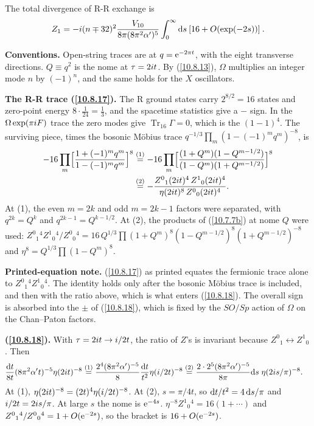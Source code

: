 	The total divergence of R-R exchange is
	\begin{equation}
		Z_{1} = -i(n\mp 32)^{2} \frac{V_{10}}{8\pi (8\pi^{2}\alpha^{\prime})^{5}}
		\int^{\infty}_{0}\mathrm{d} s \:[16+O(\exp(-2s))] \:. \label{10.8.19}
	\end{equation}
	\begin{tcolorbox}[breakable]
		\begin{remark}
			\textbf{Conventions.} Open-string traces are at $q=\mathrm{e}^{-2\pi t}$, with the eight transverse directions. $Q\equiv q^{2}$ is the nome at $\tau=2i t$. By (\ref{10.8.13}), $\Omega$ multiplies an integer mode $n$ by $(-1)^n$, and the same holds for the $X$ oscillators.

			\textbf{The R-R trace (\ref{10.8.17}).} The R ground states carry $2^{8/2}=16$ states and zero-point energy $8\cdot\tfrac1{24}=\tfrac13$, and the spacetime statistics give a $-$ sign. In the $\Omega\exp(\pi i F)$ trace the zero modes give $\operatorname{Tr}_{16}\Gamma=0$, which is the $(1-1)^{4}$. The surviving piece, times the bosonic M\"obius trace $q^{-1/3}\prod_m(1-(-1)^mq^m)^{-8}$, is
			\begin{align*}
				-16\prod_m\Bigl[\frac{1+(-1)^mq^m}{1-(-1)^mq^m}\Bigr]^{8}
				&\overset{(1)}{=}-16\prod_m\Bigl[\frac{(1+Q^{m})(1-Q^{m-1/2})}{(1-Q^{m})(1+Q^{m-1/2})}\Bigr]^{8}\\
				&\overset{(2)}{=}-\frac{Z^0{}_1(2i t)^{4}\,Z^1{}_0(2i t)^{4}}{\eta(2i t)^{8}\,Z^0{}_0(2i t)^{4}} .
			\end{align*}
			At (1), the even $m=2k$ and odd $m=2k-1$ factors were separated, with $q^{2k}=Q^{k}$ and $q^{2k-1}=Q^{k-1/2}$. At (2), the products of (\ref{10.7.7b}) at nome $Q$ were used: $Z^0{}_1{}^4Z^1{}_0{}^4/Z^0{}_0{}^4=16\,Q^{1/3}\prod(1+Q^m)^{8}(1-Q^{m-1/2})^{8}(1+Q^{m-1/2})^{-8}$ and $\eta^{8}=Q^{1/3}\prod(1-Q^m)^{8}$.

			\textbf{Printed-equation note.} (\ref{10.8.17}) as printed equates the fermionic trace alone to $Z^0{}_1{}^4Z^1{}_0{}^4$. The identity holds only after the bosonic M\"obius trace is included, and then with the ratio above, which is what enters (\ref{10.8.18}). The overall sign is absorbed into the $\pm$ of (\ref{10.8.18}), which is fixed by the $SO/Sp$ action of $\Omega$ on the Chan--Paton factors.

			\textbf{(\ref{10.8.18}).} With $\tau=2i t\to i/2t$, the ratio of $Z$'s is invariant because $Z^0{}_1\leftrightarrow Z^1{}_0$. Then
			\begin{align*}
				\frac{\mathrm{d} t}{8t}(8\pi^{2}\alpha't)^{-5}\eta(2i t)^{-8}
				&\overset{(1)}{=}\frac{2^{4}(8\pi^{2}\alpha')^{-5}}{8}\frac{\mathrm{d} t}{t^{2}}\eta(i/2t)^{-8}
				\overset{(2)}{=}\frac{2\cdot2^{5}(8\pi^{2}\alpha')^{-5}}{8\pi}\mathrm{d} s\;\eta(2i s/\pi)^{-8} .
			\end{align*}
			At (1), $\eta(2i t)^{-8}=(2t)^{4}\eta(i/2t)^{-8}$. At (2), $s=\pi/4t$, so $\mathrm{d} t/t^{2}=4\,\mathrm{d} s/\pi$ and $i/2t=2i s/\pi$. At large $s$ the nome is $\mathrm{e}^{-4s}$. $\eta^{-8}Z^1{}_0{}^4=16(1+\cdots)$ and $Z^0{}_1{}^4/Z^0{}_0{}^4=1+O(\mathrm{e}^{-2s})$, so the bracket is $16+O(\mathrm{e}^{-2s})$.


\end{remark}
\end{tcolorbox}
